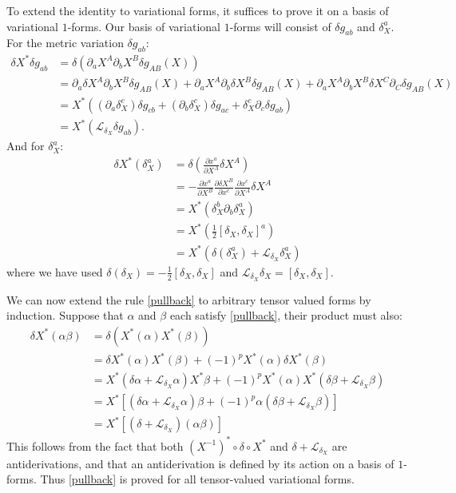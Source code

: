 \documentclass[a4paper,11pt]{article}
\begin{document}
To extend the identity to variational forms, it suffices to prove it on a basis of variational $1$-forms.
Our basis of variational $1$-forms will consist of $\delta g_{ab}$ and $\delta_X^a$.
For the metric variation $\delta g_{ab}$:
\begin{align}
\delta X^* \delta g_{ab} &= \delta (\partial_a X^A \partial_b X^B \delta g_{AB}(X)) \nonumber \\
&= \partial_a \delta X^A \partial_b X^B \delta g_{AB}(X) + 
\partial_a X^A \partial_b \delta X^B \delta g_{AB}(X) +  
\partial_a X^A \partial_b X^B \delta X^C \partial_C \delta g_{AB}(X) \nonumber \\
&= X^*( (\partial_a \delta_X^c) \delta g_{cb} + (\partial_b \delta_X^c) \delta g_{ac} + \delta_X^c \partial_c \delta g_{ab})
\nonumber \\
&= X^*( \mathcal{L}_{\delta_X} \delta g_{ab}).
\end{align}
And for $\delta_X^a$:
\begin{align}
\delta X^* (\delta_X^a) &= \delta \left( \frac{\partial x^a}{\partial X^A} \delta X^A \right) \nonumber \\
&= - \frac{\partial x^a}{\partial X^B} \frac{\partial \delta X^B}{\partial x^c} \frac{\partial x^c}{\partial X^A} \delta X^A \nonumber \\
&= X^*(\delta_X^b \partial_b \delta_X^a) \nonumber \\
&= X^*(\tfrac12 [\delta_X,\delta_X]^a) \nonumber \\
&= X^*(\delta (\delta_X^a) + \mathcal{L}_{\delta_X} \delta_X^a)
\end{align}
where we have used $\delta (\delta_X) = -\tfrac12 [\delta_X, \delta_X]$ and $\mathcal{L}_{\delta_X} \delta_X = [\delta_X, \delta_X]$.

We can now extend the rule \eqref{pullback} to arbitrary tensor valued forms by induction. 
Suppose that $\alpha$ and $\beta$ each satisfy \eqref{pullback}, their product must also:
\begin{align}
\delta X^*(\alpha \beta) &= \delta (X^*(\alpha) X^*(\beta)) \nonumber \\
&= \delta X^* (\alpha) X^* (\beta) + (-1)^p X^* (\alpha) \delta X^*(\beta) \nonumber \\
&= X^*(\delta \alpha + \mathcal{L}_{\delta_X} \alpha) X^*\beta + (-1)^p X^*(\alpha) X^*(\delta \beta + \mathcal{L}_{\delta_X} \beta) \nonumber \\
&= X^*[(\delta \alpha + \mathcal{L}_{\delta_X} \alpha) \beta + (-1)^p \alpha (\delta \beta + \mathcal{L}_{\delta_X} \beta)] \nonumber \\
&= X^*[(\delta + \mathcal{L}_{\delta_X}) (\alpha \beta)]
\end{align}
This follows from the fact that both $(X^{-1})^* \circ \delta \circ X^*$ and $\delta + \mathcal{L}_{\delta_X}$ are antiderivations, and that an antiderivation is defined by its action on a basis of $1$-forms.
Thus \eqref{pullback} is proved for all tensor-valued variational forms.
\end{document}
